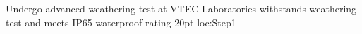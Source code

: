 {%
%
%
% 
%
\tpStep%
{Undergo advanced weathering test at VTEC Laboratories}
{\ThisSystem withstands weathering test and meets IP65 waterproof rating}
{20pt}
{loc:Step1}
%
%
%
%
%
}%


